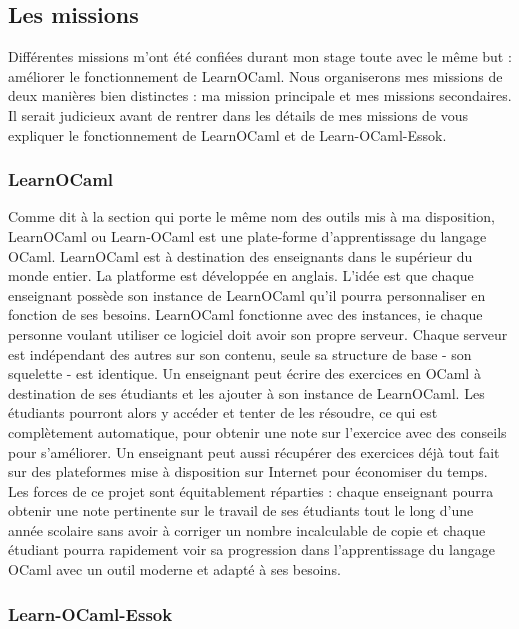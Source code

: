 \documentclass{article}
\begin{document}
\subsection{Les missions}

Différentes missions m'ont été confiées durant mon stage toute avec le même but : améliorer le fonctionnement de LearnOCaml.
Nous organiserons mes missions de deux manières bien distinctes : ma mission principale et mes missions secondaires.
Il serait judicieux avant de rentrer dans les détails de mes missions de vous expliquer le fonctionnement de LearnOCaml et de Learn-OCaml-Essok.

\subsubsection{LearnOCaml}

Comme dit à la section qui porte le même nom des outils mis à ma disposition, LearnOCaml ou Learn-OCaml est une plate-forme d’apprentissage du langage OCaml.
LearnOCaml est à destination des enseignants dans le supérieur du monde entier. La platforme est développée en anglais. L'idée est que chaque enseignant possède son instance de LearnOCaml qu'il pourra personnaliser en fonction de ses besoins.
\newline
LearnOCaml fonctionne avec des instances, ie chaque personne voulant utiliser ce logiciel doit avoir son propre serveur. Chaque serveur est indépendant des autres sur son contenu, seule sa structure de base - son squelette - est identique.
\newline
Un enseignant peut écrire des exercices en OCaml à destination de ses étudiants et les ajouter à son instance de LearnOCaml. Les étudiants pourront alors y accéder et tenter de les résoudre, ce qui est complètement automatique, pour obtenir une note sur l'exercice avec des conseils pour s'améliorer.
\newline
Un enseignant peut aussi récupérer des exercices déjà tout fait sur des plateformes mise à disposition sur Internet pour économiser du temps.
\newline
Les forces de ce projet sont équitablement réparties : chaque enseignant pourra obtenir une note pertinente sur le travail de ses étudiants tout le long d'une année scolaire sans avoir à corriger un nombre incalculable de copie et chaque étudiant pourra rapidement voir sa progression dans l'apprentissage du langage OCaml avec un outil moderne et adapté à ses besoins.

\subsubsection{Learn-OCaml-Essok}
\end{document}
